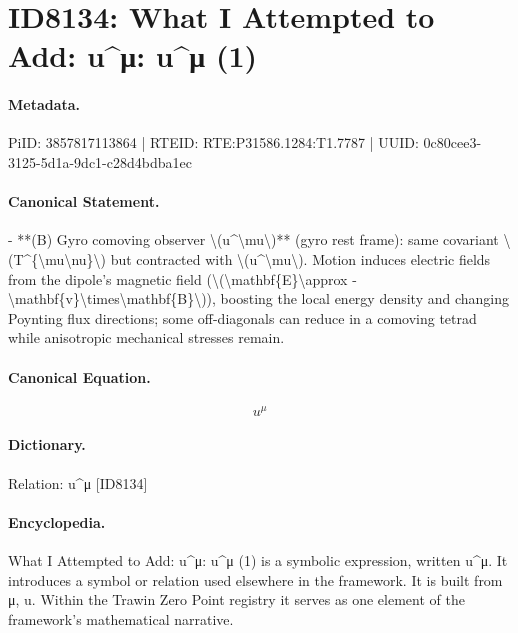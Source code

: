 \section*{ID8134: What I Attempted to Add: u\textasciicircum{}μ: u\textasciicircum{}μ (1)}
\paragraph{Metadata.}
PiID: 3857817113864 | RTEID: RTE:P31586.1284:T1.7787 | UUID: 0c80cee3-3125-5d1a-9dc1-c28d4bdba1ec

\paragraph{Canonical Statement.}
- **(B) Gyro comoving observer \textbackslash{}(u\textasciicircum{}\textbackslash{}mu\textbackslash{})** (gyro rest frame): same covariant \textbackslash{}(T\textasciicircum{}\{\textbackslash{}mu\textbackslash{}nu\}\textbackslash{}) but contracted with \textbackslash{}(u\textasciicircum{}\textbackslash{}mu\textbackslash{}). Motion induces electric fields from the dipole’s magnetic field (\textbackslash{}(\textbackslash{}mathbf\{E\}\textbackslash{}approx -\textbackslash{}mathbf\{v\}\textbackslash{}times\textbackslash{}mathbf\{B\}\textbackslash{})), boosting the local energy density and changing Poynting flux directions; some off-diagonals can reduce in a comoving tetrad while anisotropic mechanical stresses remain.

\paragraph{Canonical Equation.}
\[
u^\mu
\]

\paragraph{Dictionary.}
Relation: u\textasciicircum{}μ [ID8134]

\paragraph{Encyclopedia.}
What I Attempted to Add: u\textasciicircum{}μ: u\textasciicircum{}μ (1) is a symbolic expression, written u\textasciicircum{}μ. It introduces a symbol or relation used elsewhere in the framework. It is built from μ, u. Within the Trawin Zero Point registry it serves as one element of the framework's mathematical narrative.
